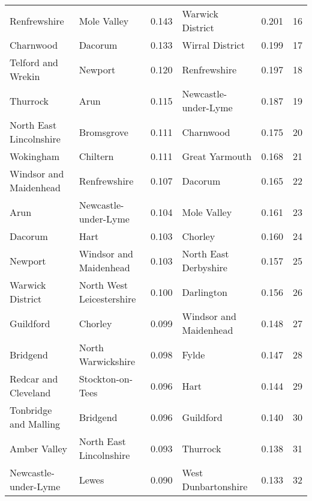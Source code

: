 \begin{tabular}{llrlrr}
Renfrewshire              &                Mole Valley &  0.143 &           Warwick District &   0.201 &    16 \\
Charnwood                 &                    Dacorum &  0.133 &            Wirral District &   0.199 &    17 \\
Telford and Wrekin        &                    Newport &  0.120 &               Renfrewshire &   0.197 &    18 \\
Thurrock                  &                       Arun &  0.115 &       Newcastle-under-Lyme &   0.187 &    19 \\
North East Lincolnshire   &                 Bromsgrove &  0.111 &                  Charnwood &   0.175 &    20 \\
Wokingham                 &                   Chiltern &  0.111 &             Great Yarmouth &   0.168 &    21 \\
Windsor and Maidenhead    &               Renfrewshire &  0.107 &                    Dacorum &   0.165 &    22 \\
Arun                      &       Newcastle-under-Lyme &  0.104 &                Mole Valley &   0.161 &    23 \\
Dacorum                   &                       Hart &  0.103 &                    Chorley &   0.160 &    24 \\
Newport                   &     Windsor and Maidenhead &  0.103 &      North East Derbyshire &   0.157 &    25 \\
Warwick District          &  North West Leicestershire &  0.100 &                 Darlington &   0.156 &    26 \\
Guildford                 &                    Chorley &  0.099 &     Windsor and Maidenhead &   0.148 &    27 \\
Bridgend                  &         North Warwickshire &  0.098 &                      Fylde &   0.147 &    28 \\
Redcar and Cleveland      &           Stockton-on-Tees &  0.096 &                       Hart &   0.144 &    29 \\
Tonbridge and Malling     &                   Bridgend &  0.096 &                  Guildford &   0.140 &    30 \\
Amber Valley              &    North East Lincolnshire &  0.093 &                   Thurrock &   0.138 &    31 \\
Newcastle-under-Lyme      &                      Lewes &  0.090 &        West Dunbartonshire &   0.133 &    32 \\

\end{tabular}
